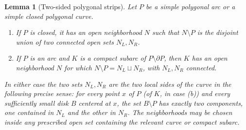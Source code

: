 \documentclass[11pt]{article}
\theoremstyle{mainplain}
\theoremstyle{mainroman}
\newtheorem{longlemma}[theorem]{Lemma}
\theoremstyle{definition}
\newcommand{\alphlabels}{\renewcommand{\labelenumi}{\textup{(\alph{enumi})}}%
  \renewcommand{\theenumi}{\alph{enumi}}}
\numberwithin{equation}{section}
\begin{document}
\begin{longlemma}[Two-sided polygonal strips]\label{lem:polygonal-collar}
Let $P$ be a simple polygonal arc or a simple closed polygonal curve.

\begin{enumerate}\alphlabels
\item If $P$ is closed, it has an open neighborhood $N$ such that
      $N\setminus P$ is the disjoint union of two connected open sets
      $N_L,N_R$.
\item If $P$ is an arc and $K$ is a compact subarc of
      $P\setminus\partial P$, then $K$ has an open neighborhood $N$
      for which $N\setminus P=N_L\sqcup N_R$, with $N_L,N_R$
      connected.
\end{enumerate}
In either case the two sets $N_L,N_R$ are the two \emph{local sides}
of the curve in the following precise sense: for every point $x$ of
$P$ (of $K$, in case \textup{(b)}) and every sufficiently small disk
$B$ centered at $x$, the set $B\setminus P$ has exactly two
components, one contained in $N_L$ and the other in $N_R$. The
neighborhoods may be chosen inside any prescribed open set
containing the relevant curve or compact subarc.
\end{longlemma}
\end{document}
